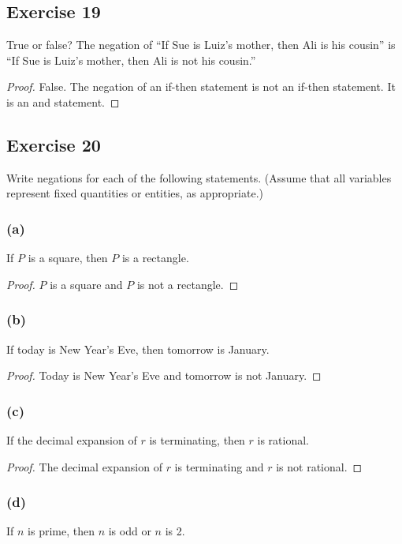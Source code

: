 \documentclass[14pt]{extarticle}
\begin{document}
\subsection{Exercise 19} True or false? The negation of “If Sue is Luiz’s mother, then Ali is his cousin” is “If Sue is Luiz’s mother, then Ali is not his cousin.”

\begin{proof}
False. The negation of an if-then statement is not an if-then
statement. It is an and statement.
\end{proof}

\subsection{Exercise 20}
Write negations for each of the following statements. (Assume that all variables represent fixed quantities or entities, as
appropriate.)

\subsubsection{(a)}
If $P$ is a square, then $P$ is a rectangle.

\begin{proof}
$P$ is a square and $P$ is not a rectangle.
\end{proof}

\subsubsection{(b)}
If today is New Year’s Eve, then tomorrow is January.

\begin{proof}
Today is New Year’s Eve and tomorrow is not January.
\end{proof}

\subsubsection{(c)}
If the decimal expansion of $r$ is terminating, then $r$ is rational.

\begin{proof}
The decimal expansion of $r$ is terminating and $r$ is not rational.
\end{proof}

\subsubsection{(d)}
If $n$ is prime, then $n$ is odd or $n$ is 2.
\end{document}
